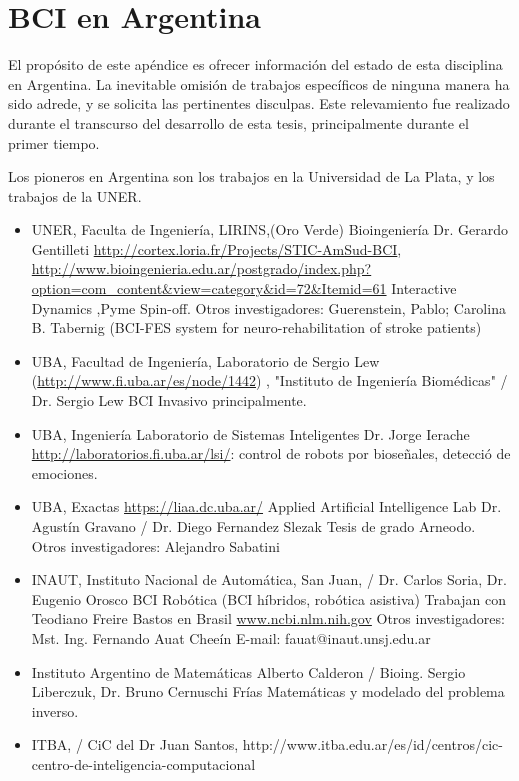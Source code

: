 \chapter{BCI en Argentina}

El propósito de este apéndice es ofrecer información del estado de esta disciplina en Argentina.  La inevitable omisión de trabajos específicos de ninguna manera ha sido adrede, y se solicita las pertinentes disculpas.  Este relevamiento fue realizado durante el transcurso del desarrollo de esta tesis, principalmente durante el primer tiempo.

Los pioneros en Argentina son los trabajos en la Universidad de La Plata, y los trabajos de la UNER.

\begin{itemize}
\item UNER, Faculta de Ingeniería, LIRINS,(Oro Verde) Bioingeniería  Dr. Gerardo Gentilleti
\url{http://cortex.loria.fr/Projects/STIC-AmSud-BCI},
\url{http://www.bioingenieria.edu.ar/postgrado/index.php?option=com_content&view=category&id=72&Itemid=61}
Interactive Dynamics ,Pyme Spin-off.
Otros investigadores: Guerenstein, Pablo; Carolina B. Tabernig (BCI-FES system for neuro-rehabilitation of stroke patients)
\item UBA, Facultad de Ingeniería, Laboratorio de Sergio Lew (\url{http://www.fi.uba.ar/es/node/1442}) , "Instituto de Ingeniería Biomédicas" / Dr. Sergio Lew
BCI Invasivo principalmente.
\item UBA, Ingeniería
Laboratorio de Sistemas Inteligentes Dr. Jorge Ierache \url{http://laboratorios.fi.uba.ar/lsi/}: control de robots por bioseñales, detecció de emociones.
\item UBA, Exactas
\url{https://liaa.dc.uba.ar/} Applied Artificial Intelligence Lab Dr. Agustín Gravano / Dr. Diego Fernandez Slezak
Tesis de grado Arneodo.
Otros investigadores: Alejandro Sabatini
\item INAUT, Instituto Nacional de Automática, San Juan, / Dr. Carlos Soria, Dr. Eugenio Orosco
BCI Robótica (BCI híbridos, robótica asistiva)
Trabajan con Teodiano Freire Bastos en Brasil
\url{www.ncbi.nlm.nih.gov}
Otros investigadores: Mst. Ing. Fernando Auat Cheeín
E-mail: fauat@inaut.unsj.edu.ar
\item Instituto Argentino de Matemáticas Alberto Calderon / Bioing. Sergio Liberczuk, Dr. Bruno Cernuschi Frías
Matemáticas y modelado del problema inverso.
\item ITBA, / CiC del Dr Juan Santos, http://www.itba.edu.ar/es/id/centros/cic-centro-de-inteligencia-computacional

\end{itemize}
